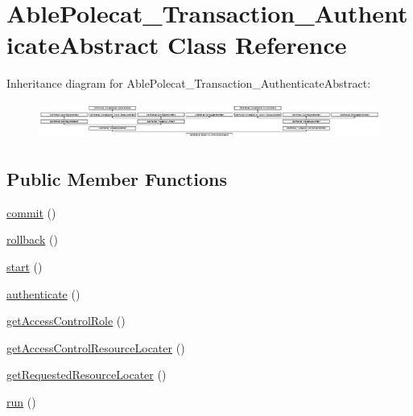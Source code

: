 \hypertarget{class_able_polecat___transaction___authenticate_abstract}{}\section{Able\+Polecat\+\_\+\+Transaction\+\_\+\+Authenticate\+Abstract Class Reference}
\label{class_able_polecat___transaction___authenticate_abstract}
Inheritance diagram for Able\+Polecat\+\_\+\+Transaction\+\_\+\+Authenticate\+Abstract\+:\begin{figure}[H]
\begin{center}
\leavevmode
\includegraphics[height=1.219512cm]{class_able_polecat___transaction___authenticate_abstract}
\end{center}
\end{figure}
\subsection*{Public Member Functions}
\begin{DoxyCompactItemize}
\item 
\hyperlink{class_able_polecat___transaction___authenticate_abstract_af5674c27d4a92f6228565010eacbb9cb}{commit} ()
\item 
\hyperlink{class_able_polecat___transaction___authenticate_abstract_afa549adf79e3f8c09fe8f903dd5fbfa7}{rollback} ()
\item 
\hyperlink{class_able_polecat___transaction___authenticate_abstract_af8fa59992209e36dccb3eefb0f75531f}{start} ()
\item 
\hyperlink{class_able_polecat___transaction___authenticate_abstract_a750c93a7dfab5314f2bf662a407bc5a6}{authenticate} ()
\item 
\hyperlink{class_able_polecat___transaction___authenticate_abstract_a3e160a8e954ef2c9421f3ed57a18bae0}{get\+Access\+Control\+Role} ()
\item 
\hyperlink{class_able_polecat___transaction___authenticate_abstract_a59afdf20b5859ddd4d6bbc77aa253705}{get\+Access\+Control\+Resource\+Locater} ()
\item 
\hyperlink{class_able_polecat___transaction___authenticate_abstract_a86aa497c7d66dac50b6a267039a5afa1}{get\+Requested\+Resource\+Locater} ()
\item 
\hyperlink{class_able_polecat___transaction___authenticate_abstract_afb0fafe7e02a3ae1993c01c19fad2bae}{run} ()
\end{DoxyCompactItemize}
